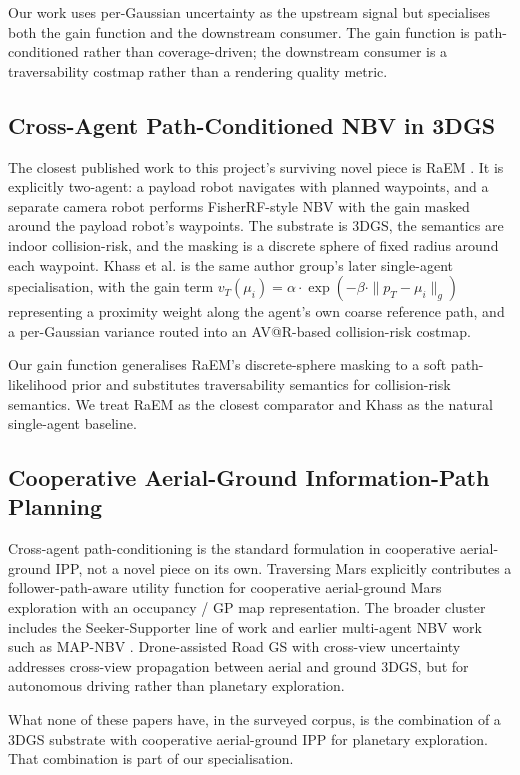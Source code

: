 \documentclass[conference]{IEEEtran}
\begin{document}
Our work uses per-Gaussian uncertainty as the upstream signal but specialises both the gain function and the downstream consumer. The gain function is path-conditioned rather than coverage-driven; the downstream consumer is a traversability costmap rather than a rendering quality metric.

\subsection{Cross-Agent Path-Conditioned NBV in 3DGS}
The closest published work to this project's surviving novel piece is RaEM \cite{raem}. It is explicitly two-agent: a payload robot navigates with planned waypoints, and a separate camera robot performs FisherRF-style NBV with the gain masked around the payload robot's waypoints. The substrate is 3DGS, the semantics are indoor collision-risk, and the masking is a discrete sphere of fixed radius around each waypoint. Khass et al. \cite{khass} is the same author group's later single-agent specialisation, with the gain term $v_T(\mu_i) = \alpha \cdot \exp(-\beta \cdot \|p_T - \mu_i\|_g)$ representing a proximity weight along the agent's own coarse reference path, and a per-Gaussian variance routed into an AV@R-based collision-risk costmap.

Our gain function generalises RaEM's discrete-sphere masking to a soft path-likelihood prior and substitutes traversability semantics for collision-risk semantics. We treat RaEM as the closest comparator and Khass as the natural single-agent baseline.

\subsection{Cooperative Aerial-Ground Information-Path Planning}
Cross-agent path-conditioning is the standard formulation in cooperative aerial-ground IPP, not a novel piece on its own. Traversing Mars \cite{traversingmars} explicitly contributes a follower-path-aware utility function for cooperative aerial-ground Mars exploration with an occupancy / GP map representation. The broader cluster includes the Seeker-Supporter line of work \cite{seekersupporter} and earlier multi-agent NBV work such as MAP-NBV \cite{mapnbv}. Drone-assisted Road GS with cross-view uncertainty \cite{droneroad} addresses cross-view propagation between aerial and ground 3DGS, but for autonomous driving rather than planetary exploration.

What none of these papers have, in the surveyed corpus, is the combination of a 3DGS substrate with cooperative aerial-ground IPP for planetary exploration. That combination is part of our specialisation.
\end{document}

